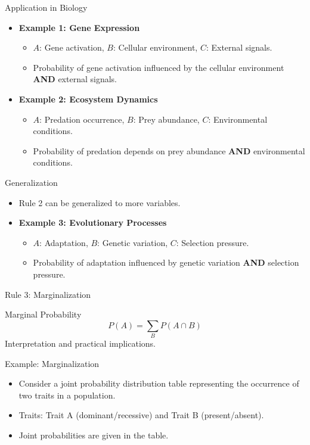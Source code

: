 \documentclass{beamer}
\begin{document}
\begin{frame}{Application in Biology}
  \begin{itemize}
    \item \textbf{Example 1: Gene Expression}
      \begin{itemize}
        \item $A$: Gene activation, $B$: Cellular environment, $C$: External signals.
        \item Probability of gene activation influenced by the cellular environment {\bf{AND}} external signals.
      \end{itemize}

    \item \textbf{Example 2: Ecosystem Dynamics}
      \begin{itemize}
        \item $A$: Predation occurrence, $B$: Prey abundance, $C$: Environmental conditions.
        \item Probability of predation depends on prey abundance  {\bf{AND}} environmental conditions.
      \end{itemize}
  \end{itemize}
\end{frame}

\begin{frame}{Generalization}
  \begin{itemize}
    \item Rule 2 can be generalized to more variables.
    \item \textbf{Example 3: Evolutionary Processes}
      \begin{itemize}
        \item $A$: Adaptation, $B$: Genetic variation, $C$: Selection pressure.
        \item Probability of adaptation influenced by genetic variation  {\bf{AND}} selection pressure.
      \end{itemize}
  \end{itemize}
\end{frame}

\begin{frame}{Rule 3: Marginalization}
  \begin{block}{Marginal Probability}
    \[
      P(A) = \sum_{B} P(A \cap B)
    \]
    Interpretation and practical implications.
  \end{block}
\end{frame}


\begin{frame}{Example: Marginalization}
  \begin{itemize}
    \item Consider a joint probability distribution table representing the occurrence of two traits in a population.
    \item Traits: Trait A (dominant/recessive) and Trait B (present/absent).
    \item Joint probabilities are given in the table.
  \end{itemize}
\end{frame}
\end{document}
